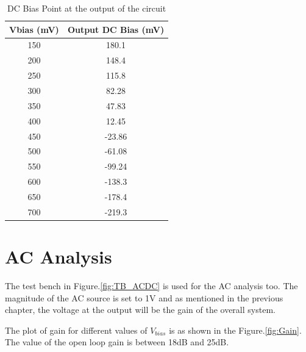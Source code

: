 \begin{table} [H]
\centering
\begin{tabular}{@{}cc@{}}
\toprule
Vbias (mV)			& Output DC Bias (mV)	\\ \midrule
150					& 180.1  \\
200					& 148.4  \\
250					& 115.8  \\
300					& 82.28	 \\
350					& 47.83	 \\
400					& 12.45	 \\
450					& -23.86 \\
500					& -61.08 \\
550					& -99.24 \\
600					& -138.3 \\
650					& -178.4 \\
700 				& -219.3 \\
\bottomrule
\end{tabular}
\caption{DC Bias Point at the output of the circuit}
\label{tab:DC}
\end{table}


\section{AC Analysis}

The test bench in Figure.\ref{fig:TB_ACDC} is used for the AC analysis too. The magnitude of the AC source is set to 1V and as mentioned in the previous chapter, the voltage at the output will be the gain of the overall system.

The plot of gain for different values of $V_{bias}$ is as shown in the Figure.\ref{fig:Gain}. The value of the open loop gain is between 18dB and 25dB.

